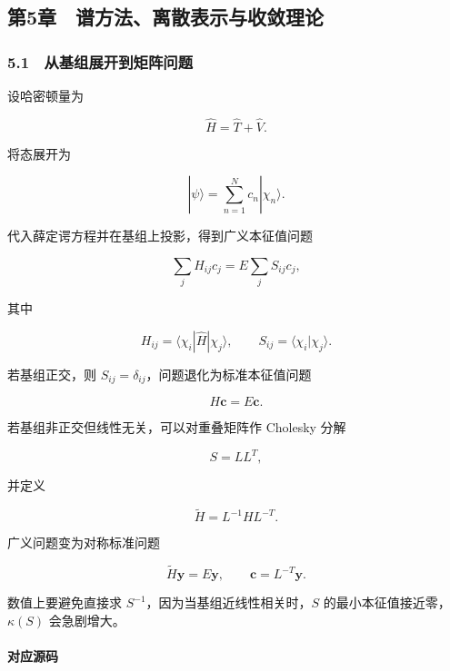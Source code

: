 \documentclass[
]{ctexbook}
\let\origsubsection\subsection
\renewcommand{\subsection}[1]{%
  \needspace{6\baselineskip}%
  \origsubsection{#1}%
}
\begin{document}
\hypertarget{ux7b2c5ux7ae0-ux8c31ux65b9ux6cd5ux79bbux6563ux8868ux793aux4e0eux6536ux655bux7406ux8bba}{%
\subsection{第5章　谱方法、离散表示与收敛理论}\label{ux7b2c5ux7ae0-ux8c31ux65b9ux6cd5ux79bbux6563ux8868ux793aux4e0eux6536ux655bux7406ux8bba}}

\hypertarget{ux4eceux57faux7ec4ux5c55ux5f00ux5230ux77e9ux9635ux95eeux9898}{%
\subsubsection{5.1　从基组展开到矩阵问题}\label{ux4eceux57faux7ec4ux5c55ux5f00ux5230ux77e9ux9635ux95eeux9898}}

设哈密顿量为

\[
\hat H=\hat T+\hat V.
\]

将态展开为

\[
|\psi\rangle=\sum_{n=1}^{N}c_n|\chi_n\rangle.
\]

代入薛定谔方程并在基组上投影，得到广义本征值问题

\[
\sum_j H_{ij}c_j
=
E\sum_j S_{ij}c_j,
\]

其中

\[
H_{ij}=\langle \chi_i|\hat H|\chi_j\rangle,
\qquad
S_{ij}=\langle \chi_i|\chi_j\rangle.
\]

若基组正交，则 \(S_{ij}=\delta_{ij}\)，问题退化为标准本征值问题

\[
H\mathbf c=E\mathbf c.
\]

若基组非正交但线性无关，可以对重叠矩阵作 Cholesky 分解

\[
S=LL^T,
\]

并定义

\[
\tilde H=L^{-1}H L^{-T}.
\]

广义问题变为对称标准问题

\[
\tilde H\mathbf y=E\mathbf y,
\qquad
\mathbf c=L^{-T}\mathbf y.
\]

数值上要避免直接求 \(S^{-1}\)，因为当基组近线性相关时，\(S\)
的最小本征值接近零，\(\kappa(S)\) 会急剧增大。

\hypertarget{ux5bf9ux5e94ux6e90ux7801-4}{%
\paragraph{对应源码}\label{ux5bf9ux5e94ux6e90ux7801-4}}
\end{document}
